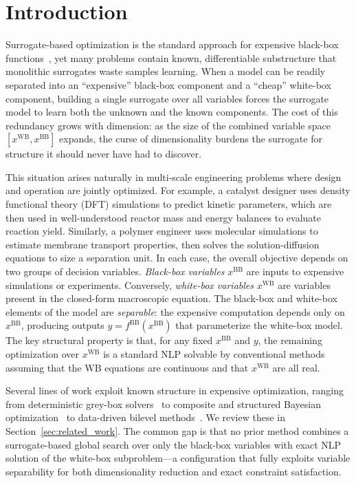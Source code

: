 \documentclass[12pt,a4paper]{article}%
\theoremstyle{plain}%
\theoremstyle{remark}%
\theoremstyle{definition}%
\def\WB{\mathrm{WB}}
\def\BB{\mathrm{BB}}
\begin{document}
\section{Introduction}\label{sec:introduction}

Surrogate-based optimization is the standard approach for expensive black-box functions~\cite{frazier2018tutorial}, yet many problems contain known, differentiable substructure that monolithic surrogates waste samples learning. When a model can be readily separated into an ``expensive'' black-box component and a ``cheap'' white-box component, building a single surrogate over all variables forces the surrogate model to learn both the unknown and the known components. The cost of this redundancy grows with dimension: as the size of the combined variable space $[x^{\WB}, x^{\BB}]$ expands, the curse of dimensionality burdens the surrogate for structure it should never have had to discover.

This situation arises naturally in multi-scale engineering problems where design and operation are jointly optimized. For example, a catalyst designer uses density functional theory (DFT) simulations to predict kinetic parameters, which are then used in well-understood reactor mass and energy balances to evaluate reaction yield. Similarly, a polymer engineer uses molecular simulations to estimate membrane transport properties, then solves the solution-diffusion equations to size a separation unit. In each case, the overall objective depends on two groups of decision variables. \emph{Black-box variables} $x^{\BB}$ are inputs to expensive simulations or experiments. Conversely, \emph{white-box variables} $x^{\WB}$ are variables present in the closed-form macroscopic equation. The black-box and white-box elements of the model are \emph{separable}: the expensive computation depends only on $x^{\BB}$, producing outputs $y = f^{\BB}(x^{\BB})$ that parameterize the white-box model. The key structural property is that, for any fixed $x^{\BB}$ and $y$, the remaining optimization over $x^{\WB}$ is a standard NLP solvable by conventional methods assuming that the $\WB$ equations are continuous and that $x^{\WB}$ are all real.

Several lines of work exploit known structure in expensive optimization, ranging from deterministic grey-box solvers~\cite{boukouvala2017greybox_jgo,boukouvala2017argonaut,eason2016trf} to composite and structured Bayesian optimization~\cite{astudillo2019bocf,paulson2022cobalt,kudva2025bonsai} to data-driven bilevel methods~\cite{beykal2020domino,kieffer2017bilevel}. We review these in Section~\ref{sec:related_work}. The common gap is that no prior method combines a surrogate-based global search over only the black-box variables with exact NLP solution of the white-box subproblem---a configuration that fully exploits variable separability for both dimensionality reduction and exact constraint satisfaction.
\end{document}
